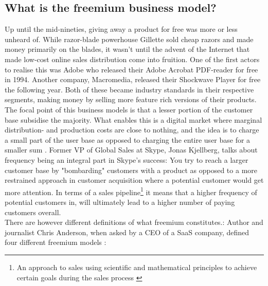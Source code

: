 \subsection{What is the freemium business model?}
Up until the mid-nineties, giving away a product for free was more or less unheard of. While razor-blade powerhouse Gillette sold cheap razors and made money primarily on the blades, it wasn't until the advent of the Internet that made low-cost online sales distribution come into fruition. One of the first actors to realise this was Adobe who released their Adobe Acrobat PDF-reader for free in 1994. Another company, Macromedia, released their Shockwave Player for free the following year. Both of these became industry standards in their respective segments, making money by selling more feature rich versions of their products\cite{katherineheires2007}.
\newline
\\
The focal point of this business models is that a lesser portion of the customer base subsidise the majority. What enables this is a digital market where marginal distribution- and production costs are close to nothing, and the idea is to charge a small part of the user base as opposed to charging the entire user base for a smaller sum \cite{chrisanderson2008}. Former VP of Global Sales at Skype, Jonas Kjellberg, talks about frequency being an integral part in Skype's success: You try to reach a larger customer base by "bombarding" customers with a product as opposed to a more restrained approach in customer acquisition where a potential customer would get more attention. In terms of a sales pipeline\footnote{An approach to sales using scientific and mathematical principles to achieve certain goals during the sales process \cite{selden1996}} it means that a higher frequency of potential customers in, will ultimately lead to a higher number of paying customers overall.
\newline
\\
There are however different definitions of what freemium constitutes.: Author and journalist Chris Anderson, when asked by a CEO of a SaaS company, defined four different freemium models \cite{chrisanderson2012}:
